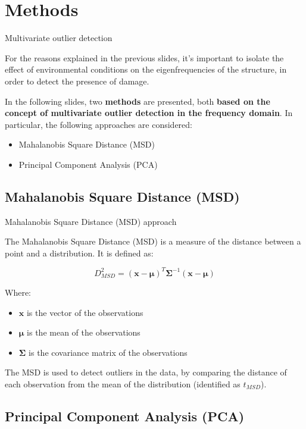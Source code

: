 \section{Methods}

\begin{frame}{Multivariate outlier detection}

    For the reasons explained in the previous slides, it's important to isolate the effect of environmental conditions on the eigenfrequencies of the structure, in order to detect the presence of damage.

    \vspace{9pt}

    In the following slides, two \textbf{methods} are presented, both \textbf{based on the concept of multivariate outlier detection in the frequency domain}.
    In particular, the following approaches are considered:

    \begin{itemize}
        \item Mahalanobis Square Distance (MSD)
        \item Principal Component Analysis (PCA)
    \end{itemize}

\end{frame}



\subsection{Mahalanobis Square Distance (MSD)}

\begin{frame}{Mahalanobis Square Distance (MSD) approach}

    The Mahalanobis Square Distance (MSD) is a measure of the distance between a point and a distribution. It is defined as:

    \begin{equation}
        D_{MSD}^2 = (\mathbf{x} - \mathbf{\mu})^T \mathbf{\Sigma}^{-1} (\mathbf{x} - \mathbf{\mu})
    \end{equation}

    Where:
    \begin{itemize}
        \item $\mathbf{x}$ is the vector of the observations
        \item $\mathbf{\mu}$ is the mean of the observations
        \item $\mathbf{\Sigma}$ is the covariance matrix of the observations
    \end{itemize}

    The MSD is used to detect outliers in the data, by comparing the distance of each observation from the mean of the distribution (identified as $t_{MSD}$).

\end{frame}



\subsection{Principal Component Analysis (PCA)}
